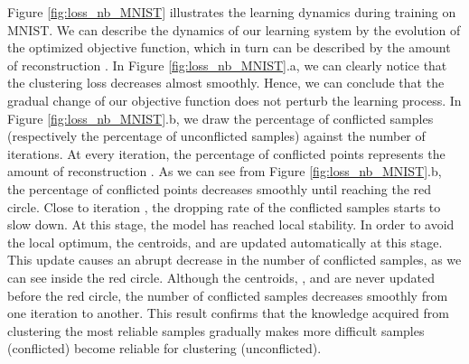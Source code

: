 \documentclass{article}
\begin{document}
Figure \ref{fig:loss_nb_MNIST} illustrates the learning dynamics during training on MNIST. We can describe the dynamics of our learning system by the evolution of the optimized objective function, which in turn can be described by the amount of reconstruction . In Figure \ref{fig:loss_nb_MNIST}.a, we can clearly notice that the clustering loss decreases almost smoothly. Hence, we can conclude that the gradual change of our objective function does not perturb the learning process. In Figure \ref{fig:loss_nb_MNIST}.b, we draw the percentage of conflicted samples (respectively the percentage of unconflicted samples) against the number of iterations. At every iteration, the percentage of conflicted points represents the amount of reconstruction . As we can see from Figure \ref{fig:loss_nb_MNIST}.b, the percentage of conflicted points decreases smoothly until reaching the red circle. Close to iteration , the dropping rate of the conflicted samples starts to slow down. At this stage, the model has reached local stability. In order to avoid the local optimum, the centroids,  and  are updated automatically at this stage. This update causes an abrupt decrease in the number of conflicted samples, as we can see inside the red circle. Although the centroids, , and  are never updated before the red circle, the number of conflicted samples decreases smoothly from one iteration to another. This result confirms that the knowledge acquired from clustering the most reliable samples gradually makes more difficult samples (conflicted) become reliable for clustering (unconflicted).



\begin{figure*}[ht]
\vskip 0.2in
\centering
    \caption{Learning dynamics during training on MNIST.}
\label{fig:loss_nb_MNIST}
\end{figure*}
\end{document}
